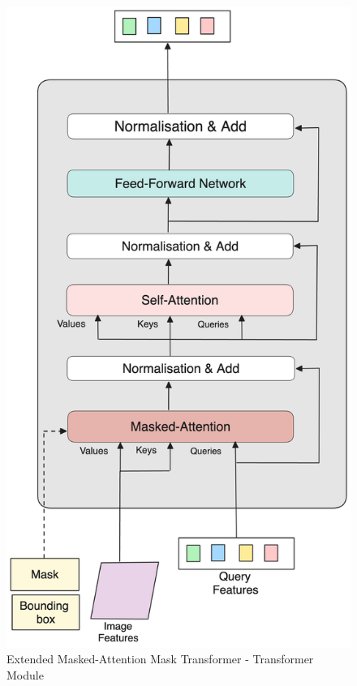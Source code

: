 \begin{figure}[h!]
    \centering
    \includegraphics[scale=0.1]{Figures/emamt-encoder.png}
    \caption{Extended Masked-Attention Mask Transformer - Transformer Module}
    \label{fig:emamt-trm}
\end{figure}

